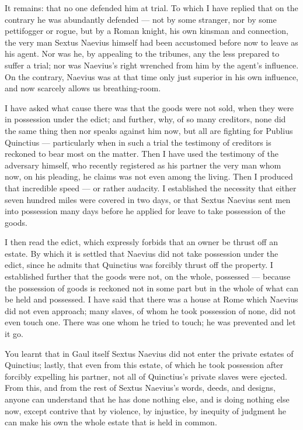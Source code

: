  It remains: that no one defended him at trial. To which I have replied that on the contrary he was abundantly defended --- not by some stranger, nor by some pettifogger or rogue, but by a Roman knight, his own kinsman and connection, the very man Sextus Naevius himself had been accustomed before now to leave as his agent. Nor was he, by appealing to the tribunes, any the less prepared to suffer a trial; nor was Naevius's right wrenched from him by the agent's influence. On the contrary, Naevius was at that time only just superior in his own influence, and now scarcely allows us breathing-room.

 I have asked what cause there was that the goods were not sold, when they were in possession under the edict; and further, why, of so many creditors, none did the same thing then nor speaks against him now, but all are fighting for Publius Quinctius --- particularly when in such a trial the testimony of creditors is reckoned to bear most on the matter. Then I have used the testimony of the adversary himself, who recently registered as his partner the very man whom now, on his pleading, he claims was not even among the living. Then I produced that incredible speed --- or rather audacity. I established the necessity that either seven hundred miles were covered in two days, or that Sextus Naevius sent men into possession many days before he applied for leave to take possession of the goods.

 I then read the edict, which expressly forbids that an owner be thrust off an estate. By which it is settled that Naevius did not take possession under the edict, since he admits that Quinctius was forcibly thrust off the property. I established further that the goods were not, on the whole, possessed --- because the possession of goods is reckoned not in some part but in the whole of what can be held and possessed. I have said that there was a house at Rome which Naevius did not even approach; many slaves, of whom he took possession of none, did not even touch one. There was one whom he tried to touch; he was prevented and let it go.

 You learnt that in Gaul itself Sextus Naevius did not enter the private estates of Quinctius; lastly, that even from this estate, of which he took possession after forcibly expelling his partner, not all of Quinctius's private slaves were ejected. From this, and from the rest of Sextus Naevius's words, deeds, and designs, anyone can understand that he has done nothing else, and is doing nothing else now, except contrive that by violence, by injustice, by inequity of judgment he can make his own the whole estate that is held in common.

